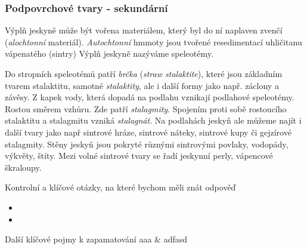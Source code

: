 %
\subsubsection{Podpovrchové tvary - sekundární}
Výplň jeskyně může být vořena materiálem, který byl do ní naplaven zvenčí (\emph{alochtonní} materiál). \emph{Autochtonní} hmmoty jsou tvořené resedimentací uhličitanu vápenatého (sintry) Výplň jeskyně nazýváme speleotémy. 

Do stropních speleotémů patří \emph{brčka} (\textit{straw stalaktite}), které jsou základním tvarem stalaktitu, samotné \emph{stalaktity}, ale i další formy jako např. záclony a závěsy. Z kapek vody, která dopadá na podlahu vznikají podlahové speleotémy. Rostou směrem vzhůru. Zde patří \emph{stalagmity}. Spojením proti sobě rostoucího stalaktitu a stalagmitu vzniká \emph{stalagnát}. Na podlahách jeskyň ale můžeme najít i další tvary jako např sintrové hráze, sintrové náteky, sintrové kupy či gejzírové stalagmity. Stěny jeskyň jsou pokryté různými sintrovými povlaky, vodopády, výkvěty, štíty. Mezi volné sintrové tvary se řadí jeskynní perly, vápencové škraloupy.


\newpage
\onecolumn
\begin{boxotazky}{Kontrolní a klíčové otázky, na které bychom měli znát odpověď}
	\begin{itemize}
		\item 
		\item 
		
	\end{itemize}
\end{boxotazky}

\begin{boxslovnik}{Další klíčové pojmy k zapamatování}
	aaa & adfasd \\
	
\end{boxslovnik}
\twocolumn